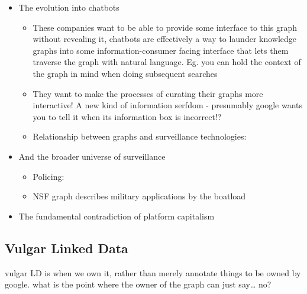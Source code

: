 \begin{itemize}

\item
  The evolution into chatbots

  \begin{itemize}
  
  \item
    These companies want to be able to provide some interface to this
    graph without revealing it, chatbots are effectively a way to
    launder knowledge graphs into some information-consumer facing
    interface that lets them traverse the graph with natural language.
    Eg. you can hold the context of the graph in mind when doing
    subsequent searches
  \item
    They want to make the processes of curating their graphs more
    interactive! A new kind of information serfdom - presumably google
    wants you to tell it when its information box is incorrect!?
  \item
    Relationship between graphs and surveillance technologies: \cite{iliadisSeerSeenSurveying2022} 
  \end{itemize}
\item
  And the broader universe of surveillance

  \begin{itemize}
  
  \item
    Policing: \cite{brayneBigDataSurveillance2017, braynePredictSurveilData2020} 
  \item
    NSF graph describes military applications by the boatload
  \end{itemize}
\item
  The fundamental contradiction of platform capitalism
\end{itemize}

\hypertarget{vulgar-linked-data}{%
\subsection{Vulgar Linked Data}\label{vulgar-linked-data}}

vulgar LD is when we own it, rather than merely annotate things to be
owned by google. what is the point where the owner of the graph can just
say\ldots{} no?
